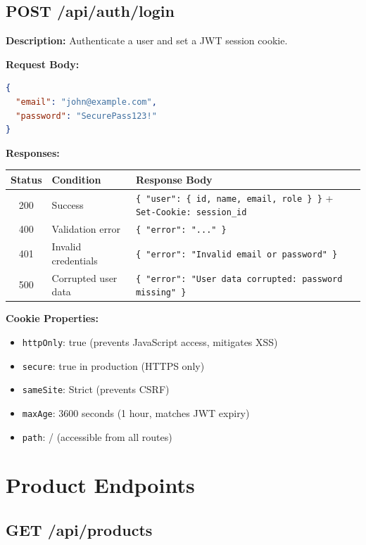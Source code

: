 ﻿\documentclass[12pt,a4paper]{report}
\begin{document}
\subsection{POST /api/auth/login}

\textbf{Description:} Authenticate a user and set a JWT session cookie.

\textbf{Request Body:}
\begin{lstlisting}[language=JSON,caption={Login request body}]
{
  "email": "john@example.com",
  "password": "SecurePass123!"
}
\end{lstlisting}

\textbf{Responses:}
\begin{center}
\begin{tabular}{clp{7cm}}
  \toprule
  \textbf{Status} & \textbf{Condition} & \textbf{Response Body} \\
  \midrule
  200 & Success & \texttt{\{ "user": \{ id, name, email, role \} \}} + \texttt{Set-Cookie: session\_id} \\
  400 & Validation error & \texttt{\{ "error": "..." \}} \\
  401 & Invalid credentials & \texttt{\{ "error": "Invalid email or password" \}} \\
  500 & Corrupted user data & \texttt{\{ "error": "User data corrupted: password missing" \}} \\
  \bottomrule
\end{tabular}
\end{center}

\textbf{Cookie Properties:}
\begin{itemize}[leftmargin=1.5em]
  \item \texttt{httpOnly}: true (prevents JavaScript access, mitigates XSS)
  \item \texttt{secure}: true in production (HTTPS only)
  \item \texttt{sameSite}: Strict (prevents CSRF)
  \item \texttt{maxAge}: 3600 seconds (1 hour, matches JWT expiry)
  \item \texttt{path}: / (accessible from all routes)
\end{itemize}

\section{Product Endpoints}

\subsection{GET /api/products}
\end{document}
